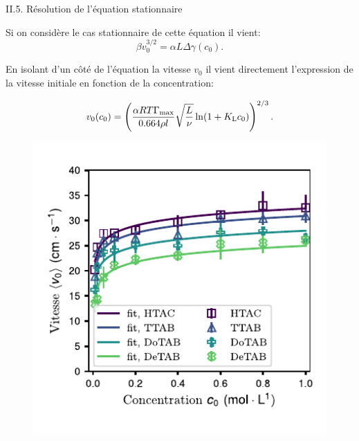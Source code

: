 \documentclass[aspectratio=169,10pt]{beamer}
\begin{document}
    \begin{frame}{II.5. Résolution de l'équation stationnaire}
\begin{minipage}{.5\textwidth}
  Si on considère le cas stationnaire de cette équation il vient:
  \begin{equation}
      \beta v_0^{3/2} = \alpha L\Delta\gamma(c_0).\label{eq:stationnaire}
    \end{equation}
    
    
    En isolant d'un côté de l'équation la vitesse $v_0$ il vient directement l'expression de la vitesse initiale en fonction de la concentration:
   \begin{ombretheo}
    \begin{theo}
    \begin{equation}
      v_0(c_0)=\left(\frac{\alpha RT\Gamma_{\rm max}}{0.664\rho l}\sqrt{\frac{L}{\nu}}\ln(1+K_{\rm L}c_0)\right)^{2/3}.
      \label{eqn:v0}
    \end{equation}
  \end{theo}
\end{ombretheo}
\end{minipage}\hfill
\begin{minipage}{.45\textwidth}
  \begin{figure}
    \includegraphics[width=1\textwidth]{./figures/Bateau_v0_final.pdf}
\end{figure}
\end{minipage}
  \end{frame}
  
\end{document}
